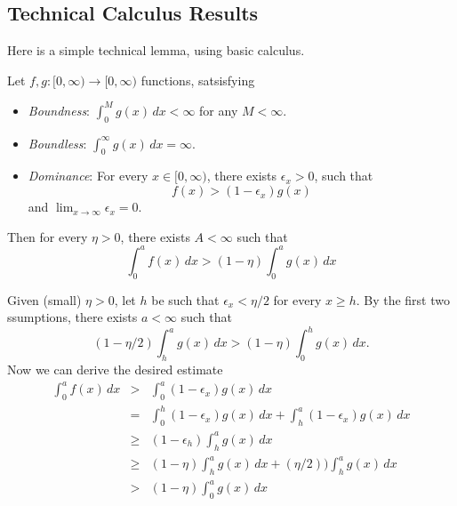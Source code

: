 \subsection{Technical Calculus Results}

Here is a simple technical lemma, using basic calculus.
\begin{llem} \label{lem:fg:bnless}
Let \(f,g:[0,\infty)\to[0,\infty)\) functions, satsisfying
\begin{itemize}
 \item \emph{Boundness}: \(\int_0^M g(x)\,dx < \infty\)  for any \(M<\infty\).
 \item \emph{Boundless}: \(\int_0^\infty g(x)\,dx = \infty\).
 \item \emph{Dominance}:
   For every \(x\in[0,\infty)\), there exists \(\epsilon_x > 0\),
   such that
   \begin{equation*}
    f(x) > (1-\epsilon_x)g(x)
   \end{equation*}
   and \(\lim_{x\to\infty} \epsilon_x = 0\).
\end{itemize}
Then for every \(\eta>0\), there exists \(A<\infty\) such that
\begin{equation*}
 \int_0^a f(x)\,dx > (1 - \eta)\int_0^a g(x)\,dx
\end{equation*}
\end{llem}
\begin{thmproof}
Given (small) \(\eta>0\), let $h$ be such that \(\epsilon_x < \eta/2\)
for every \(x\geq h\). By the first two ssumptions,
there exists \(a<\infty\) such that
\begin{equation*}
 (1-\eta/2)\int_h^a g(x)\,dx > (1-\eta) \int_0^h g(x)\,dx.
\end{equation*}
Now we can derive the desired estimate
\begin{eqnarray*}
 \int_0^a f(x)\,dx
 &>& \int_0^a (1-\epsilon_x)g(x)\,dx  \\
 &=&   \int_0^h (1-\epsilon_x)g(x)\,dx  + \int_h^a (1-\epsilon_x)g(x)\,dx  \\
 &\geq& (1-\epsilon_h)\int_h^a g(x)\,dx  \\
 &\geq& (1-\eta)\int_h^a g(x)\,dx + (\eta/2))\int_h^a g(x)\,dx  \\
 &>& (1 - \eta)\int_0^a g(x)\,dx
\end{eqnarray*}

\end{thmproof}


